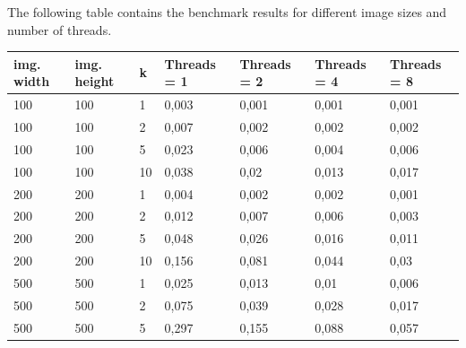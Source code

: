 \documentclass[a4paper,10pt]{article}
\begin{document}
The following table contains the benchmark results for different image sizes and number of threads. 

\begin{table}[h]
\begin{tabular}{|l|l|l|l|l|l|l|}
\hline
\textbf{img. width} & \textbf{img. height} & \textbf{k} & \textbf{Threads = 1} & \textbf{Threads = 2} & \textbf{Threads = 4} & \textbf{Threads = 8} \\ \hline
100                 & 100                  & 1          & 0,003                & 0,001                & 0,001                & 0,001                \\ \hline
100                 & 100                  & 2          & 0,007                & 0,002                & 0,002                & 0,002                \\ \hline
100                 & 100                  & 5          & 0,023                & 0,006                & 0,004                & 0,006                \\ \hline
100                 & 100                  & 10         & 0,038                & 0,02                 & 0,013                & 0,017                \\ \hline
200                 & 200                  & 1          & 0,004                & 0,002                & 0,002                & 0,001                \\ \hline
200                 & 200                  & 2          & 0,012                & 0,007                & 0,006                & 0,003                \\ \hline
200                 & 200                  & 5          & 0,048                & 0,026                & 0,016                & 0,011                \\ \hline
200                 & 200                  & 10         & 0,156                & 0,081                & 0,044                & 0,03                 \\ \hline
500                 & 500                  & 1          & 0,025                & 0,013                & 0,01                 & 0,006                \\ \hline
500                 & 500                  & 2          & 0,075                & 0,039                & 0,028                & 0,017                \\ \hline
500                 & 500                  & 5          & 0,297                & 0,155                & 0,088                & 0,057                \\ \hline

\end{tabular}
\end{table}
\end{document}
